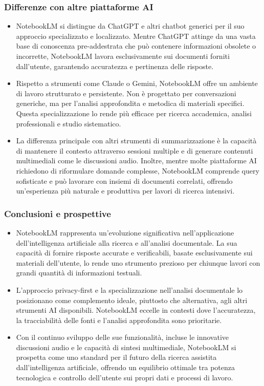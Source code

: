 \documentclass[aspectratio=169]{beamer}
\begin{document}
%
%
\begin{frame}
\frametitle{Differenze con altre piattaforme AI}
\begin{itemize}
\item NotebookLM si distingue da ChatGPT e altri chatbot generici per il suo approccio specializzato e localizzato. Mentre ChatGPT attinge da una vasta base di conoscenza pre-addestrata che può contenere informazioni obsolete o incorrette, NotebookLM lavora esclusivamente sui documenti forniti dall'utente, garantendo accuratezza e pertinenza delle risposte.

\item Rispetto a strumenti come Claude o Gemini, NotebookLM offre un ambiente di lavoro strutturato e persistente. Non è progettato per conversazioni generiche, ma per l'analisi approfondita e metodica di materiali specifici. Questa specializzazione lo rende più efficace per ricerca accademica, analisi professionali e studio sistematico.

\item La differenza principale con altri strumenti di summarizzazione è la capacità di mantenere il contesto attraverso sessioni multiple e di generare contenuti multimediali come le discussioni audio. Inoltre, mentre molte piattaforme AI richiedono di riformulare domande complesse, NotebookLM comprende query sofisticate e può lavorare con insiemi di documenti correlati, offrendo un'esperienza più naturale e produttiva per lavori di ricerca intensivi.
\end{itemize}
\end{frame}
%
%
\begin{frame}
\frametitle{Conclusioni e prospettive}
\begin{itemize}
\item NotebookLM rappresenta un'evoluzione significativa nell'applicazione dell'intelligenza artificiale alla ricerca e all'analisi documentale. La sua capacità di fornire risposte accurate e verificabili, basate esclusivamente sui materiali dell'utente, lo rende uno strumento prezioso per chiunque lavori con grandi quantità di informazioni testuali.

\item L'approccio privacy-first e la specializzazione nell'analisi documentale lo posizionano come complemento ideale, piuttosto che alternativa, agli altri strumenti AI disponibili. NotebookLM eccelle in contesti dove l'accuratezza, la tracciabilità delle fonti e l'analisi approfondita sono prioritarie.

\item Con il continuo sviluppo delle sue funzionalità, incluse le innovative discussioni audio e le capacità di sintesi multimediale, NotebookLM si prospetta come uno standard per il futuro della ricerca assistita dall'intelligenza artificiale, offrendo un equilibrio ottimale tra potenza tecnologica e controllo dell'utente sui propri dati e processi di lavoro.
\end{itemize}
\end{frame}
%
\end{document}
